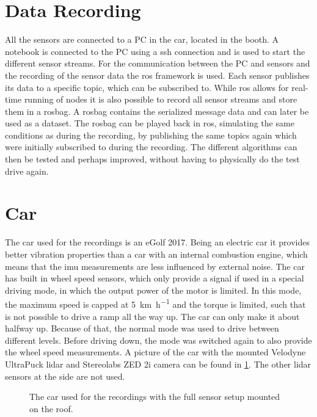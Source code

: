 \section{Data Recording}
All the sensors are connected to a PC in the car, located in the booth.
A notebook is connected to the PC using a \gls{ssh} connection and is used to start the different sensor streams.
For the communication between the PC and sensors and the recording of the sensor data the \gls{ros} framework is used.
Each sensor publishes its data to a specific topic, which can be subscribed to.
While \gls{ros} allows for real-time running of nodes it is also possible to record all sensor streams and store them in a rosbag.
A rosbag contains the serialized message data and can later be used as a dataset.
The rosbag can be played back in \gls{ros}, simulating the same conditions as during the recording, by publishing the same topics again which were initially subscribed to during the recording.
The different algorithms can then be tested and perhaps improved, without having to physically do the test drive again.



\section{Car}
\label{sec:car}
The car used for the recordings is an eGolf 2017.
Being an electric car it provides better vibration properties than a car with an internal combustion engine, which means that the \gls{imu} measurements are less influenced by external noise.
The car has built in wheel speed sensors, which only provide a signal if used in a special driving mode, in which the output power of the motor is limited.
In this mode, the maximum speed is capped at \SI{5}{\kilo\metre\per\hour} and the torque is limited, such that is not possible to drive a ramp all the way up.
The car can only make it about halfway up.
Because of that, the normal mode was used to drive between different levels.
Before driving down, the mode was switched again to also provide the wheel speed measurements.
A picture of the car with the mounted Velodyne UltraPuck \gls{lidar} and Stereolabs ZED 2i camera can be found in \cref{fig:eGolf}.
The other \gls{lidar} sensors at the side are not used.
\begin{figure}[htb]
    \centering
    
    \caption[Car with mounted sensors]{The car used for the recordings with the full sensor setup mounted on the roof.}
    \label{fig:eGolf}
\end{figure}



